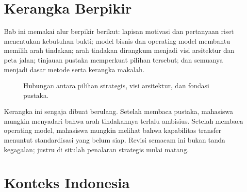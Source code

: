 \section{Kerangka Berpikir}

Bab ini memakai alur berpikir berikut: lapisan motivasi dan pertanyaan riset
menentukan kebutuhan bukti; model bisnis dan operating model membantu memilih
arah tindakan; arah tindakan dirangkum menjadi visi arsitektur dan peta jalan;
tinjauan pustaka memperkuat pilihan tersebut; dan semuanya menjadi dasar metode
serta kerangka makalah.

\begin{figure}[htbp]
\centering
{}
\caption{Hubungan antara pilihan strategis, visi arsitektur, dan fondasi
pustaka.}
\label{fig:vision-literature-loop}
\end{figure}

Kerangka ini sengaja dibuat berulang. Setelah membaca pustaka, mahasiswa
mungkin menyadari bahwa arah tindakannya terlalu ambisius. Setelah membaca
operating model, mahasiswa mungkin melihat bahwa kapabilitas transfer menuntut
standardisasi yang belum siap. Revisi semacam ini bukan tanda kegagalan;
justru di situlah penalaran strategis mulai matang.

\section{Konteks Indonesia}

